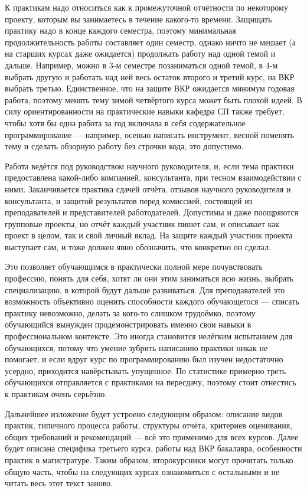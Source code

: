 \documentclass{article}
\begin{document}
К практикам надо относиться как к промежуточной отчётности по некоторому проекту, которым вы занимаетесь в течение какого-то времени. Защищать практику надо в конце каждого семестра, поэтому минимальная продолжительность работы составляет один семестр, однако ничто не мешает (а на старших курсах даже ожидается) продолжать работу над одной темой и дальше. Например, можно в 3-м семестре позаниматься одной темой, в 4-м выбрать другую и работать над ней весь остаток второго и третий курс, на ВКР выбрать третью. Единственное, что на защите ВКР ожидается минимум годовая работа, поэтому менять тему зимой четвёртого курса может быть плохой идеей. В силу ориентированности на практические навыки кафедра СП также требует, чтобы хотя бы одна работа за год включала в себя содержательное программирование --- например, осенью написать инструмент, весной поменять тему и сделать обзорную работу без строчки кода, это допустимо.

Работа ведётся под руководством научного руководителя, и, если тема практики предоставлена какой-либо компанией, консультанта, при тесном взаимодействии с ними. Заканчивается практика сдачей отчёта, отзывов научного руководителя и консультанта, и защитой результатов перед комиссией, состоящей из преподавателей и представителей работодателей. Допустимы и даже поощряются групповые проекты, но отчёт каждый участник пишет сам, и описывает как проект в целом, так и свой личный вклад. На защите каждый участник проекта выступает сам, и тоже должен явно обозначить, что конкретно он сделал.

Это позволяет обучающимся в практически полной мере почувствовать профессию, понять для себя, хотят ли они этим заниматься всю жизнь, выбрать специализацию, в которой будут дальше развиваться. Для преподавателей это возможность объективно оценить способности каждого обучающегося --- списать практику невозможно, делать за кого-то слишком трудоёмко, поэтому обучающийся вынужден продемонстрировать именно свои навыки в профессиональном контексте. Это иногда становится нелёгким испытанием для обучающихся, потому что умение зубрить написанию практики никак не помогает, и если вдруг курс по программированию был изучен недостаточно усердно, приходится навёрстывать упущенное. По статистике примерно треть обучающихся отправляется с практиками на пересдачу, поэтому стоит отнестись к практикам очень серьёзно.

Дальнейшее изложение будет устроено следующим образом: описание видов практик, типичного процесса работы, структуры отчёта, критериев оценивания, общих требований и рекомендаций --- всё это применимо для всех курсов. Далее будет описана специфика третьего курса, работы над ВКР бакалавра, особенности практик в магистратуре. Таким образом, второкурсники могут прочитать только общую часть, чтобы на следующих курсах ознакомиться с остальными и не читать весь этот текст заново.
\end{document}
